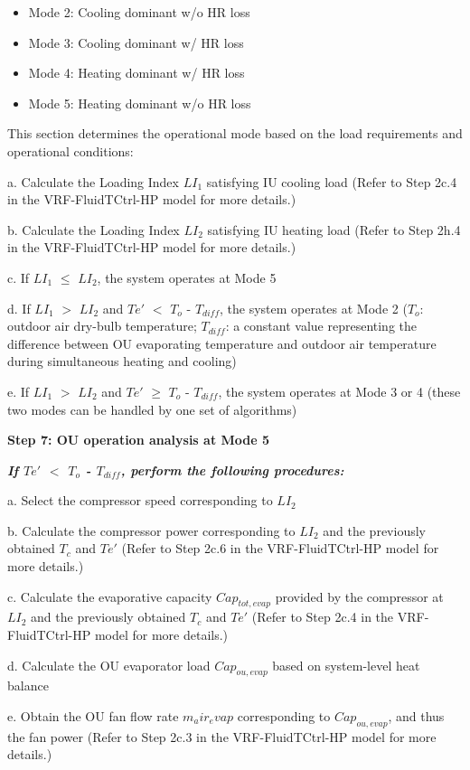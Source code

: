 \begin{itemize}
  \item
    Mode 2: Cooling dominant w/o HR loss
  \item
    Mode 3: Cooling dominant w/ HR loss
  \item
    Mode 4: Heating dominant w/ HR loss
  \item
    Mode 5: Heating dominant w/o HR loss
\end{itemize}

This section determines the operational mode based on the load requirements and operational conditions:

a. Calculate the Loading Index $LI_1$ satisfying IU cooling load (Refer to Step 2c.4 in the VRF-FluidTCtrl-HP model for more details.)

b. Calculate the Loading Index $LI_2$ satisfying IU heating load (Refer to Step 2h.4 in the VRF-FluidTCtrl-HP model for more details.)

c. If $LI_1$ $\leq$ $LI_2$, the system operates at Mode 5

d. If $LI_1$ $>$ $LI_2$ and $Te'$ $<$ $T_o$ - $T_{diff}$, the system operates at Mode 2 
($T_o$: outdoor air dry-bulb temperature; $T_{diff}$: a constant value representing the difference between OU evaporating temperature and outdoor air temperature during simultaneous heating and cooling)

e. If $LI_1$ $>$ $LI_2$ and $Te'$ $\geq$  $T_o$ - $T_{diff}$, the system operates at Mode 3 or 4 (these two modes can be handled by one set of algorithms)

\textbf{Step 7: OU operation analysis at Mode 5}

\emph{\textbf{If $Te'$ $<$ $T_o$ - $T_{diff}$, perform the following procedures:}}

a. Select the compressor speed corresponding to $LI_2$

b. Calculate the compressor power corresponding to $LI_2$ and the previously obtained $T_c$ and $Te'$
(Refer to Step 2c.6 in the VRF-FluidTCtrl-HP model for more details.)

c. Calculate the evaporative capacity $Cap_{tot,evap}$ provided by the compressor at $LI_2$ and the previously obtained $T_c$ and $Te'$
(Refer to Step 2c.4 in the VRF-FluidTCtrl-HP model for more details.)

d. Calculate the OU evaporator load $Cap_{ou,evap}$ based on system-level heat balance

e. Obtain the OU fan flow rate $m_air_evap$ corresponding to $Cap_{ou,evap}$, and thus the fan power
(Refer to Step 2c.3 in the VRF-FluidTCtrl-HP model for more details.)


